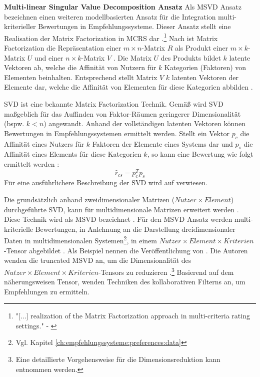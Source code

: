 
\textbf{Multi-linear Singular Value Decomposition Ansatz}
Als \ac{MSVD} Ansatz bezeichnen \textcite[S. 864]{adomavicius:4:inbook} einen weiteren modellbasierten Ansatz für die Integration multi-kriterieller Bewertungen in Empfehlungssysteme.
Dieser Ansatz stellt eine Realisation der Matrix Factorization in \ac{MCRS} dar \cite[S. 864]{adomavicius:4:inbook}.\footnote{"[...] realization of the Matrix Factorization approach in multi-criteria rating settings." - \cite[S. 864]{adomavicius:4:inbook}}
Nach \textcite[S. 94]{recommenderSystems:2016} ist Matrix Factorization die Repräsentation einer $m \times n$-Matrix $R$ als Produkt einer $m \times k$-Matrix $U$ und einer $n \times k$-Matrix $V$ \cite[S. 94]{recommenderSystems:2016}.
Die Matrix $U$ des Produkts bildet $k$ latente Vektoren ab, welche die Affinität von Nutzern für $k$ Kategorien (Faktoren) von Elementen beinhalten.
Entsprechend stellt Matrix $V$ $k$ latenten Vektoren der Elemente dar, welche die Affinität von Elementen für diese Kategorien abbilden \cite[S. 94]{recommenderSystems:2016}.

\ac{SVD} ist eine bekannte \cite[S. 83]{koren:inbook} Matrix Factorization Technik.
Gemäß \textcite[S. 864]{adomavicius:4:inbook} wird \ac{SVD} maßgeblich für das Auffinden von Faktor-Räumen geringerer Dimensionalität (bspw. $k < n$) angewandt.
Anhand der vollständigen latenten Vektoren können Bewertungen in Empfehlungssystemen ermittelt werden.
Stellt ein Vektor $p_{c}$ die Affinität eines Nutzers für $k$ Faktoren der Elemente eines Systems dar und $p_{s}$ die Affinität eines Elements für diese Kategorien $k$, so kann eine Bewertung wie folgt ermittelt werden \cite[S. 865]{adomavicius:4:inbook}:
\begin{equation}\label{eq29}
    \hat{r}_{cs} = p_{c}^{T}p_{s}
\end{equation}
Für eine ausführlichere Beschreibung der \ac{SVD} wird auf \textcite[S. 234ff.]{amatriain:inbook} verwiesen.

Die grundsätzlich anhand zweidimensionaler Matrizen ($Nutzer \times Element$) durchgeführte \ac{SVD}, kann für multidimensionale Matrizen erweitert werden \cite[S. 865]{adomavicius:4:inbook}.
Diese Technik wird als \ac{MSVD} bezeichnet \cite[S. 865]{adomavicius:4:inbook}.
Für den \ac{MSVD} Ansatz werden multi-kriterielle Bewertungen, in Anlehnung an die Darstellung dreidimensionaler Daten in multidimensionalen Systemen\footnote{Vgl. Kapitel \ref{ch:empfehlungssysteme:preferences:data}}, in einem $Nutzer \times Element \times Kriterien$-Tensor abgebildet \cite[S. 1235]{li:2:inproceedings}.
Als Beispiel nennen \textcite[S. 865]{adomavicius:4:inbook} die Veröffentlichung von \textcite[S. 1235ff.]{li:2:inproceedings}.
Die Autoren wenden die truncated \ac{MSVD} an, um die Dimensionalität des $Nutzer \times Element \times Kriterien$-Tensors zu reduzieren \cite[S. 865]{adomavicius:4:inbook}.\footnote{Eine detaillierte Vorgehensweise für die Dimensionsreduktion kann \textcite[S. 6f]{ruble:article} entnommen werden.}
Basierend auf dem näherungsweisen Tensor, wenden \textcite[S. 1236]{li:2:inproceedings} Techniken des kollaborativen Filterns an, um Empfehlungen zu ermitteln.

